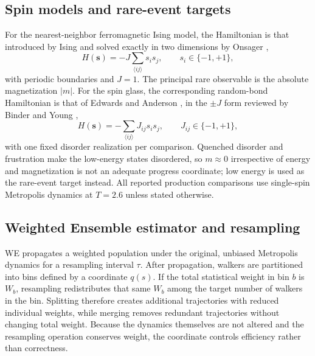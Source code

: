 \documentclass[a4paper,fleqn]{cas-sc}
\begin{document}
\subsection{Spin models and rare-event targets}\label{sec:models}
For the nearest-neighbor ferromagnetic Ising model, the Hamiltonian is that introduced by
Ising \citep{ising1925} and solved exactly in two dimensions by Onsager \citep{onsager1944},
\begin{equation}
H(\mathbf s)=-J\sum_{\langle ij\rangle}s_is_j,\qquad s_i\in\{-1,+1\},
\label{eq:ising}
\end{equation}
with periodic boundaries and $J=1$. The principal rare observable is the absolute
magnetization $|m|$. For the spin glass, the corresponding random-bond Hamiltonian is that of Edwards and Anderson
\citep{edwards1975}, in the $\pm J$ form reviewed by Binder and Young \citep{binder1986},
\begin{equation}
H(\mathbf s)=-\sum_{\langle ij\rangle}J_{ij}s_is_j,\qquad J_{ij}\in\{-1,+1\},
\label{eq:ea}
\end{equation}
with one fixed disorder realization per comparison. Quenched disorder and frustration make
the low-energy states disordered, so $m\approx0$ irrespective of energy and magnetization is
not an adequate progress coordinate; low energy is used as the rare-event target instead. All
reported production comparisons use single-spin Metropolis dynamics \citep{metropolis1953}
at $T=2.6$ unless stated otherwise.

\subsection{Weighted Ensemble estimator and resampling}\label{sec:we}
WE propagates a weighted population under the original, unbiased Metropolis dynamics for a
resampling interval $\tau$. After propagation, walkers are partitioned into bins defined by a
coordinate $q(s)$. If the total statistical weight in bin $b$ is $W_b$, resampling
redistributes that same $W_b$ among the target number of walkers in the bin. Splitting
therefore creates additional trajectories with reduced individual weights, while merging
removes redundant trajectories without changing total weight. Because the dynamics themselves
are not altered and the resampling operation conserves weight, the coordinate controls
efficiency rather than correctness.
\end{document}
